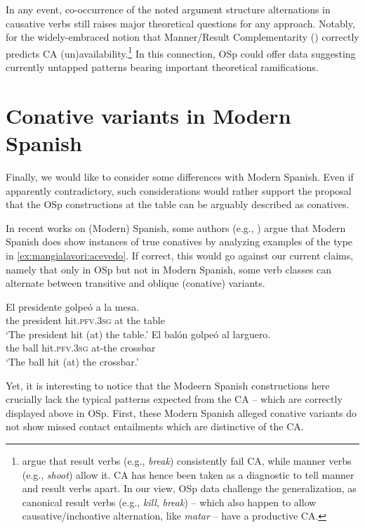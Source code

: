 \documentclass[output=paper,colorlinks,citecolor=brown,
]{langscibook}
\begin{document}
In any event, co-occurrence of the noted argument structure alternations in causative verbs still raises major theoretical questions for any approach. Notably, for the widely-embraced notion that Manner/Result Complementarity (\citealt{RappaportHovavAndLevin2010}) correctly predicts CA (un)availability.\footnote{\citet{LevinAndRappaportHovav2013,LevinAndRappaportHovav2014} argue that result verbs (e.g., \textit{break}) consistently fail CA, while manner verbs (e.g., \textit{shoot}) allow it. CA has hence been taken as a diagnostic to tell manner and result verbs apart. In our view, OSp data challenge the generalization, as canonical result verbs (e.g., \textit{kill}, \textit{break}) -- which also happen to allow causative/inchoative alternation, like \textit{matar} -- have a productive CA.} In this connection, OSp could offer data suggesting currently untapped patterns bearing important theoretical ramifications.

\section{Conative variants in Modern Spanish}\label{sec:mangialavori:5}
Finally, we would like to consider some differences with Modern Spanish. Even if apparently contradictory, such considerations would rather support the proposal that the OSp constructions at the table can be arguably described as conatives.

In recent works on (Modern) Spanish, some authors (e.g., \citealt{Acevedo2011}) argue that Modern Spanish does show instances of true conatives by analyzing examples of the type in  \ref{ex:mangialavori:acevedo}. If correct, this would go against our current claims, namely that only in OSp but not in Modern Spanish, some verb classes can alternate between transitive and oblique (conative) variants.

\ea\label{ex:mangialavori:acevedo}
  \ea
    \gll El presidente golpeó a la mesa.\\
the president hit.\textsc{pfv}.\textsc{3sg} at the table\\
    \glt ‘The president hit (at) the table.’
  \ex
    \gll El balón golpeó al larguero.\\
 the ball hit.\textsc{pfv}.\textsc{3sg} at-the crossbar\\
    \glt ‘The ball hit (at) the crossbar.’
  \z 
\z 

Yet, it is interesting to notice that the Modeern Spanish constructions here crucially lack the typical patterns expected from the CA -- which are correctly displayed above in OSp. First, these Modern Spanish alleged conative variants do not show missed contact entailments which are distinctive of the CA. 
\end{document}
